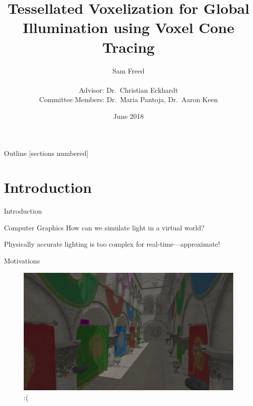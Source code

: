 \documentclass[10pt]{beamer}
\title{Tessellated Voxelization for Global Illumination using Voxel Cone Tracing}
\date{June 2018}
\author{Sam Freed\\\\Advisor: Dr.\ Christian Eckhardt\\Committee Members: Dr.\ Maria Pantoja, Dr.\ Aaron Keen\\}
\institute{California Polytechnic State University, San Luis Obispo}
\begin{document}
\frame{\titlepage}




\begin{frame}{Outline}
  [sections numbered]
  \tableofcontents[hideallsubsections]
\end{frame}


\section{Introduction}
\begin{frame}{Introduction}

  \begin{block}{Computer Graphics}
    How can we simulate light in a virtual world?

    Physically accurate lighting is too complex for real-time---approximate!
  \end{block}
\end{frame}

\begin{frame}{Motivations}
  \begin{figure}
    \includegraphics[width=\textwidth]{gi_off.png}
    \caption*{:(}
  \end{figure}
\end{frame}
\end{document}
